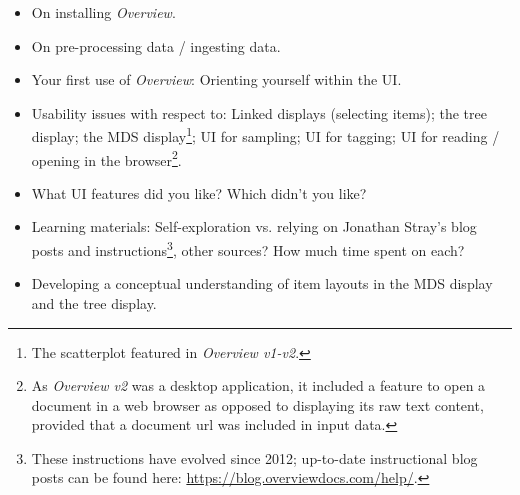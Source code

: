 \begin{itemize}
    \item On installing {\it Overview}.
    \item On pre-processing data / ingesting data.
    \item Your first use of {\it Overview}: Orienting yourself within the \ac{UI}.
    \item Usability issues with respect to: Linked displays (selecting items); the tree display; the \ac{MDS} display\footnote{The scatterplot featured in {\it Overview v1-v2}.}; \ac{UI} for sampling; \ac{UI} for tagging; \ac{UI} for reading / opening in the browser\footnote{As {\it Overview v2} was a desktop application, it included a feature to open a document in a web browser as opposed to displaying its raw text content, provided that a document url was included in input data.}.
    \item What UI features did you like? Which didn't you like?
\end{itemize}


\begin{itemize}
    \item Learning materials: Self-exploration vs. relying on Jonathan Stray's blog posts and instructions\footnote{These instructions have evolved since 2012; up-to-date instructional blog posts can be found here: \url{https://blog.overviewdocs.com/help/}.}, other sources? How much time spent on each?
    \item Developing a conceptual understanding of item layouts in the \ac{MDS} display and the tree display. 
\end{itemize}


